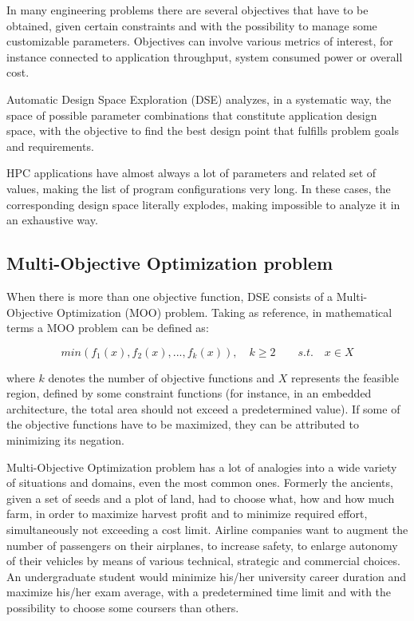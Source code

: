 In many engineering problems there are several objectives that have to be obtained, given certain constraints and with the possibility to manage some customizable parameters. Objectives can involve various metrics of interest, for instance connected to application throughput, system consumed power or overall cost.

Automatic Design Space Exploration (DSE) analyzes, in a systematic way, the space of possible parameter combinations that constitute application design space, with the objective to find the best design point that fulfills problem goals and requirements.

HPC applications have almost always a lot of parameters and related set of values, making the list of program configurations very long. In these cases, the corresponding design space literally explodes, making impossible to analyze it in an exhaustive way.

\subsection{Multi-Objective Optimization problem}

When there is more than one objective function, DSE consists of a Multi-Objective Optimization (MOO) problem. Taking \cite{caramia2008multi} as reference, in mathematical terms a MOO problem can be defined as:

\begin{equation}
        min( f_1(x), f_2(x), ..., f_k(x) ), \quad k \ge 2 \qquad s.t. \quad x \in X
\end{equation}

where $k$ denotes the number of objective functions and $X$ represents the feasible region, defined by some constraint functions (for instance, in an embedded architecture, the total area should not exceed a predetermined value). If some of the objective functions have to be maximized, they can be attributed to minimizing its negation.

Multi-Objective Optimization problem has a lot of analogies into a wide variety of situations and domains, even the most common ones. Formerly the ancients, given a set of seeds and a plot of land, had to choose what, how and how much farm, in order to maximize harvest profit and to minimize required effort, simultaneously not exceeding a cost limit. Airline companies want to augment the number of passengers on their airplanes, to increase safety, to enlarge autonomy of their vehicles by means of various technical, strategic and commercial choices. An undergraduate student would minimize his/her university career duration and maximize his/her exam average, with a predetermined time limit and with the possibility to choose some coursers than others.

